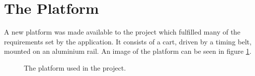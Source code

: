 \section{The Platform} %
\label{sec:the_platform}
A new platform was made available to the project which fulfilled many of the requirements set by the application.
It consists of a cart, driven by a timing belt, mounted on an aluminium rail.
An image of the platform can be seen in figure \ref{fig:platform}.
\begin{figure}[H]
 	\centering
 	\caption{The platform used in the project.}
 	\label{fig:platform}
 \end{figure} 

